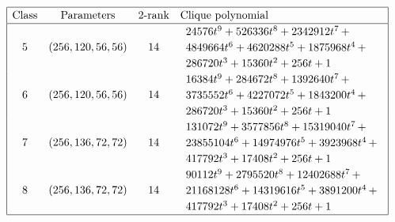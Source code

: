 \documentclass[12pt,a4paper]{article}
\begin{document}
\begin{table}[!bhpt] %
\small{}
\begin{align*}
\def\arraystretch{1.2}
\begin{array}{|cccl|}
\hline
\text{Class} &
\text{Parameters} &
\text{2-rank} &
\text{Clique polynomial}
\\
\hline
5 &
(256, 120, 56, 56) &
14 &
\begin{array}{l}
24576t^{9} + 526336t^{8} + 2342912t^{7}
\,+
\\
 4849664t^{6} + 4620288t^{5} + 1875968t^{4}
\,+
\\
 286720t^{3} + 15360t^{2} + 256t + 1
\end{array}
\\
6 &
(256, 120, 56, 56) &
14 &
\begin{array}{l}
16384t^{9} + 284672t^{8} + 1392640t^{7}
\,+
\\
 3735552t^{6} + 4227072t^{5} + 1843200t^{4}
\,+
\\
 286720t^{3} + 15360t^{2} + 256t + 1
\end{array}
\\
7 &
(256, 136, 72, 72) &
14 &
\begin{array}{l}
131072t^{9} + 3577856t^{8} + 15319040t^{7}
\,+
\\
 23855104t^{6} + 14974976t^{5} + 3923968t^{4}
\,+
\\
 417792t^{3} + 17408t^{2} + 256t + 1
\end{array}
\\
8 &
(256, 136, 72, 72) &
14 &
\begin{array}{l}
90112t^{9} + 2795520t^{8} + 12402688t^{7}
\,+
\\
 21168128t^{6} + 14319616t^{5} + 3891200t^{4}
\,+
\\
 417792t^{3} + 17408t^{2} + 256t + 1
\end{array}
\\
\hline
\end{array}
\end{align*}
%
\caption{$[f_{8,6}]$ extended Cayley classes (part 2).}
\label{tab-c8_6_EC_classes_2}
\end{table}
\end{document}
